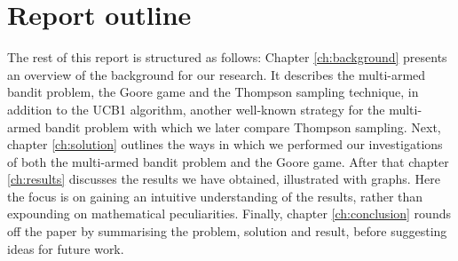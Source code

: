 \section{Report outline}
The rest of this report is structured as follows: Chapter \ref{ch:background} presents an overview of the background for our research.
It describes the multi-armed bandit problem, the Goore game and the Thompson sampling technique, in addition to the UCB1 algorithm, another well-known strategy for the multi-armed bandit problem with which we later compare Thompson sampling.
Next, chapter \ref{ch:solution} outlines the ways in which we performed our investigations of both the multi-armed bandit problem and the Goore game.
After that chapter \ref{ch:results} discusses the results we have obtained, illustrated with graphs.
Here the focus is on gaining an intuitive understanding of the results, rather than expounding on mathematical peculiarities.
Finally, chapter \ref{ch:conclusion} rounds off the paper by summarising the problem, solution and result, before suggesting ideas for future work.
